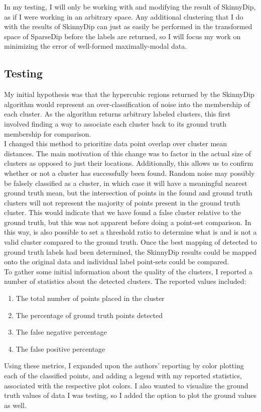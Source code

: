 \documentclass{sig-alternate-05-2015}
\begin{document}
In my testing, I will only be working with and modifying the result of SkinnyDip, as if I were working in an arbitrary space. Any additional clustering that I do with the results of SkinnyDip can just as easily be performed in the transformed space of SparseDip before the labels are returned, so I will focus my work on minimizing the error of well-formed maximally-modal data.

\subsection{Testing}
My initial hypothesis was that the hypercubic regions returned by the SkinnyDip algorithm would represent an over-classification of noise into the membership of each cluster. As the algorithm returns arbitrary labeled clusters, this first involved finding a way to associate each cluster back to its ground truth membership for comparison. \\

I changed this method to prioritize data point overlap over cluster mean distances. The main motivation of this change was to factor in the actual size of clusters as opposed to just their locations. Additionally, this allows us to confirm whether or not a cluster has successfully been found. Random noise may possibly be falsely classified as a cluster, in which case it will have a meaningful nearest ground truth mean, but the intersection of points in the found and ground truth clusters will not represent the majority of points present in the ground truth cluster. This would indicate that we have found a false cluster relative to the ground truth, but this was not apparent before doing a point-set comparison. In this way, is also possible to set a threshold ratio to determine what is and is not a valid cluster compared to the ground truth. Once the best mapping of detected to ground truth labels had been determined, the SkinnyDip results could be mapped onto the original data and individual label point-sets could be compared. \\

To gather some initial information about the quality of the clusters, I reported a number of statistics about the detected clusters. The reported values included:
\begin{enumerate}
	\item The total number of points placed in the cluster
	\item The percentage of ground truth points detected
	\item The false negative percentage
	\item The false positive percentage
\end{enumerate}
Using these metrics, I expanded upon the authors' reporting by color plotting each of the classified points, and adding a legend with my reported statistics, associated with the respective plot colors. I also wanted to visualize the ground truth values of data I was testing, so I added the option to plot the ground values as well. 
\end{document}

